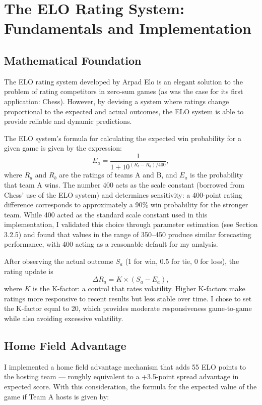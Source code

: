\documentclass[a4paper,10.5pt,twoside]{article}
\begin{document}
\section{The ELO Rating System: Fundamentals and Implementation}

\subsection{Mathematical Foundation}

The ELO rating system developed by Arpad Elo is an elegant solution to the problem of rating competitors in zero-sum games (as was the case for its first application: Chess). However, by devising a system where ratings change proportional to the expected and actual outcomes, the ELO system is able to provide reliable and dynamic predictions.

The ELO system's formula for calculating the expected win probability for a given game is given by the expression:
\[
E_a = \frac{1}{1 + 10^{(R_b - R_a) / 400}},
\]
where $R_a$ and $R_b$ are the ratings of teams A and B, and $E_a$ is the probability that team A wins. The number 400 acts as the scale constant (borrowed from Chess' use of the ELO system) and determines sensitivity: a 400-point rating difference corresponds to approximately a 90\% win probability for the stronger team. While 400 acted as the standard scale constant used in this implementation, I validated this choice through parameter estimation (see Section 3.2.5) and found that values in the range of 350--450 produce similar forecasting performance, with 400 acting as a reasonable default for my analysis.

After observing the actual outcome $S_a$ (1 for win, 0.5 for tie, 0 for loss), the rating update is
\[
\Delta R_a = K \times (S_a - E_a),
\]
where $K$ is the K-factor: a control that rates volatility. Higher K-factors make ratings more responsive to recent results but less stable over time. I chose to set the K-factor equal to 20, which provides moderate responsiveness game-to-game while also avoiding excessive volatility.

\subsection{Home Field Advantage}

I implemented a home field advantage mechanism that adds 55 ELO points to the hosting team — roughly equivalent to a +3.5-point spread advantage in expected score. With this consideration, the formula for the expected value of the game if Team A hosts is given by:
\end{document}
